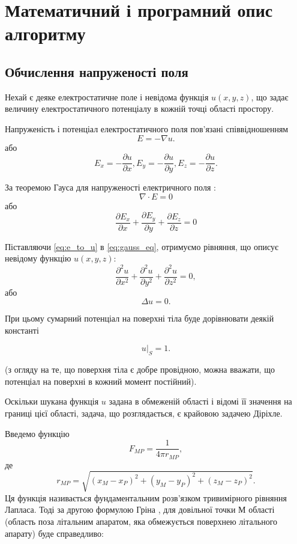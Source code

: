 \documentclass[a4paper,12pt]{article}
\begin{document}
\newpage

\section{Математичний і програмний опис алгоритму}

\subsection{Обчислення напруженості поля}

Нехай є деяке електростатичне поле і невідома функція $u(x,y,z)$, що задає величину електростатичного потенціалу в кожній точці області простору.

Напруженість і потенціал електростатичного поля пов’язані співвідношенням
\[
E = -\nabla u.
\]
або
\begin{equation} \label{eq:e_to_u}
E_x = -\frac{\partial u}{\partial x}, E_y = -\frac{\partial u}{\partial y}, E_z = -\frac{\partial u}{\partial z}.
\end{equation}

За теоремою Гауса для напруженості електричного поля \cite{magnet}:
\[
\nabla \cdot E = 0
\]
або
\begin{equation} \label{eq:gauss_eq}
\frac{\partial E_x}{\partial x} + \frac{\partial E_y}{\partial y} + \frac{\partial E_z}{\partial z} = 0
\end{equation}

Піставляючи \ref{eq:e_to_u} в \ref{eq:gauss_eq}, отримуємо рівняння, що описує невідому функцію $u(x,y,z)$:
\[
\frac{\partial ^2 u}{\partial x^2} + \frac{\partial ^2 u}{\partial y^2} + \frac{\partial ^2 u}{\partial z^2} = 0,
\] або
\[
\Delta u = 0.
\]

При цьому сумарний потенціал на поверхні тіла буде дорівнювати деякій константі

\[
\left.u\right|_S = 1.
\]

(з огляду на те, що поверхня тіла є добре провідною, можна вважати, що потенціал на поверхні в кожний момент постійний).

Оскільки шукана функція $u$ задана в обмеженій області і відомі її значення на границі цієї області, задача, що розглядається, є крайовою задачею Діріхле.

Введемо функцію \[F_{MP} = \frac{1}{4\pi r_{MP}},\] де \[r_{MP} = \sqrt{(x_M - x_P)^2 + (y_M - y_P)^2 + (z_M - z_P)^2}.\]
Ця функція називається фундаментальним розв’язком тривимірного рівняння Лапласа. Тоді за другою формулою Гріна \cite{ilina}, для довільної точки М області (область поза літальним апаратом, яка обмежується поверхнею літального апарату) буде справедливо:
\end{document}
